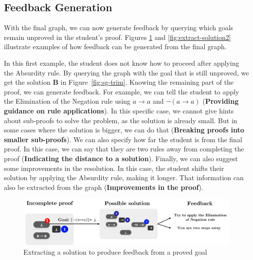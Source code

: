 \subsection{Feedback Generation}
With the final graph, we can now generate feedback by querying which goals remain unproved in the student's proof. Figures \ref{fig:extract-solution} and \ref{fig:extract-solution2} illustrate examples of how feedback can be generated from the final graph.

In this first example, the student does not know how to proceed after applying the Absurdity rule. By querying the  graph with the goal that is still unproved, we get the solution \textbf{B} in Figure~\ref{fig:sg-trim}. Knowing the remaining part of the proof, we can generate feedback. For example, we can tell the student to apply the Elimination of the Negation rule using \(a \to a \) and  \(\lnot(a \to a) \) (\textbf{Providing guidance on rule applications}). In this specific case, we cannot give hints about sub-proofs to solve the problem, as the solution is already small. But in some cases where the solution is bigger, we can do that (\textbf{Breaking proofs into smaller sub-proofs}). We can also specify how far the student is from the final proof. In this case, we can say that they are two rules away from completing the proof (\textbf{Indicating the distance to a solution}). Finally, we can also suggest some improvements in the resolution. In this case, the student shifts their solution by applying the Absurdity rule, making it longer. That information can also be extracted from the graph (\textbf{Improvements in the proof}).

\begin{figure}
    \centering
    \includegraphics[width=1\linewidth]{resources/trim-pos-feed.jpg}
    \caption{Extracting a solution to produce feedback from a proved goal}
    \label{fig:extract-solution}
\end{figure}

